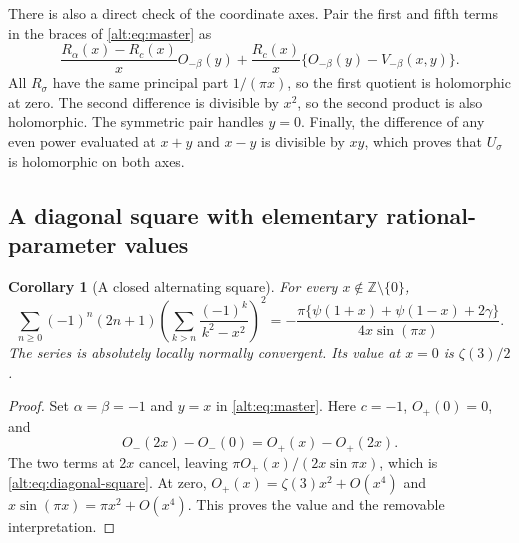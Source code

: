 \documentclass[11pt]{article}
\newtheorem{corollary}[theorem]{Corollary}
\theoremstyle{definition}
\theoremstyle{remark}
\numberwithin{equation}{section}
\begin{document}
There is also a direct check of the coordinate axes. Pair the first
and fifth terms in the braces of \eqref{alt:eq:master} as
\[
 \frac{R_\alpha(x)-R_c(x)}xO_{-\beta}(y)
 +\frac{R_c(x)}x\{O_{-\beta}(y)-V_{-\beta}(x,y)\}.
\]
All $R_\sigma$ have the same principal part $1/(\pi x)$, so the
first quotient is holomorphic at zero. The second difference is
divisible by $x^2$, so the second product is also holomorphic.
The symmetric pair handles $y=0$. Finally, the difference of any
even power evaluated at $x+y$ and $x-y$ is divisible by $xy$,
which proves that $U_\sigma$ is holomorphic on both axes.

\subsection{A diagonal square with elementary rational-parameter values}

\begin{corollary}[A closed alternating square]
\label{alt:cor:square}
For every $x\notin\mathbb Z\setminus\{0\}$,
\begin{equation}\label{alt:eq:diagonal-square}
 \boxed{\displaystyle
 \sum_{n\ge0}(-1)^n(2n+1)
       \left(\sum_{k>n}\frac{(-1)^k}{k^2-x^2}\right)^2
 =-\frac{\pi\{\psi(1+x)+\psi(1-x)+2\gamma\}}
             {4x\sin(\pi x)}.}
\end{equation}
The series is absolutely locally normally convergent. Its value at
$x=0$ is $\zeta(3)/2$.
\end{corollary}
\begin{proof}
Set $\alpha=\beta=-1$ and $y=x$ in
\eqref{alt:eq:master}. Here $c=-1$, $O_+(0)=0$, and
\[
 O_-(2x)-O_-(0)=O_+(x)-O_+(2x).
\]
The two terms at $2x$ cancel, leaving
$\pi O_+(x)/(2x\sin\pi x)$, which is
\eqref{alt:eq:diagonal-square}. At zero,
$O_+(x)=\zeta(3)x^2+O(x^4)$ and
$x\sin(\pi x)=\pi x^2+O(x^4)$. This proves the value and the
removable interpretation.
\end{proof}
\end{document}
